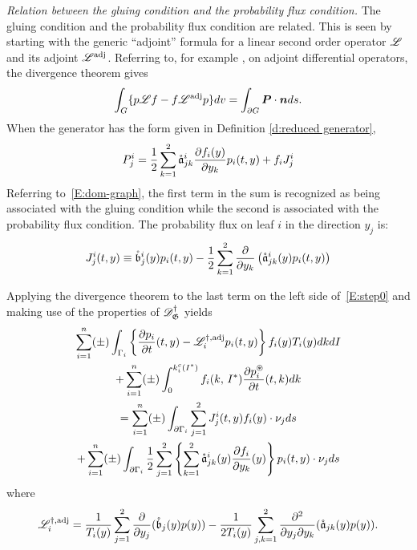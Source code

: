 \begin{remark}
\emph{Relation between the gluing condition and the probability flux condition.}
The gluing condition and the probability flux condition are related. This is seen by starting with the generic ``adjoint'' formula for a linear second order operator $\mathscr L$ and its adjoint $\mathscr L^\text{adj}$. Referring to, for example \citet[\S3.6]{zauderer98:_partial_differ_equat_of_applied_mathem}, on adjoint differential operators, the divergence theorem gives
\[
\int_G \{p \mathscr L f - f \mathscr L^{\text{adj}} p \}dv = \int_{\partial G} \boldsymbol{P}\cdot\boldsymbol{n} ds.
\]
When the generator has the form given in Definition \ref{d:reduced generator},
\[
P_j^i = \frac12 \sum_{k=1}^2 \mathring{\mathfrak a}^i_{jk} \frac{\partial f_{i}(y)}{\partial y_k} p_i(t,y) + f_i J_j^i
\]
Referring to~\eqref{E:dom-graph}, the first term in the sum is
recognized as being associated with the gluing condition while the
second is associated with the probability flux condition. The probability flux on leaf $i$ in the direction $y_j$ is:
\begin{equation}
\label{E:prob flux}
J_j^i(t,y) \equiv \mathring{\mathfrak{b}}_{j}^{i}(y) p_{i}(t,y) - \frac12 \sum_{k=1}^2 \frac{\partial}{\partial y_k} \left(
\mathring{\mathfrak a}_{jk}^i(y) p_i(t,y)\right)
\end{equation}
\end{remark}

Applying the divergence theorem to the last term on the left side of~\eqref{E:step0} and making use of the properties of $\mathscr{D}_\mathfrak G^\dag$ yields
\begin{multline}
\sum_{i=1}^n (\pm) \int_{\Gamma_i} \left\{ \frac{\partial p_{i}}{\partial t}(t,y) - \mathscr L^{\dagger,\text{adj}}_{i} p_{i} (t,y) \right\} f_{i}(y) T_{i}(y) dk dI\\
+ \sum_{i=1}^n (\pm) \int_{0}^{k_{i}^{c}(I^*)} f_{i}(k,\,I^*) \frac{\partial p_i^\circledast}{\partial t}(t,k) dk\\
= \sum_{i=1}^n(\pm) \int_{\partial\Gamma_i} \sum_{j=1}^2 J_j^i(t,y) f_i(y) \cdot \nu_j ds\\
+ \sum_{i=1}^n (\pm) \int_{\partial\Gamma_i} \frac12 \sum_{j=1}^2 \left\{\sum_{k=1}^2 \mathring{\mathfrak a}_{jk}^i(y) \frac{\partial f_{i}}{\partial y_k}(y)\right\} p_{i}(t,y) \cdot \nu_j ds
\label{E:step6}
\end{multline}
where
\[
\mathscr L^{\dagger,\text{adj}}_i = \frac{1}{T_i(y)} \sum_{j=1}^2 \frac{\partial}{\partial y_j}(\mathring{\mathfrak b}_j(y) p(y)) - \frac{1}{2 T_i(y)} \sum_{j,k=1}^2 \frac{\partial^2}{\partial y_j \partial y_k} (\mathring{\mathfrak a}_{jk}(y) p(y)).
\]

